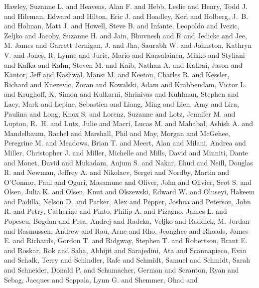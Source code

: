 \documentclass{aa}
\begin{document}
{{{{{{{{{{{{{{{{         {Hawley}, Suzanne L. and {Heavens}, Alan F. and {Hebb}, Leslie and
         {Henry}, Todd J. and {Hileman}, Edward and {Hilton}, Eric J. and
         {Hoadley}, Keri and {Holberg}, J.~B. and {Holman}, Matt J. and
         {Howell}, Steve B. and {Infante}, Leopoldo and {Ivezic}, Zeljko and
         {Jacoby}, Suzanne H. and {Jain}, Bhuvnesh and {R} and {Jedicke} and
         {Jee}, M. James and {Garrett Jernigan}, J. and {Jha}, Saurabh W. and
         {Johnston}, Kathryn V. and {Jones}, R. Lynne and {Juric}, Mario and
         {Kaasalainen}, Mikko and {Styliani} and {Kafka} and {Kahn}, Steven M. and
         {Kaib}, Nathan A. and {Kalirai}, Jason and {Kantor}, Jeff and
         {Kasliwal}, Mansi M. and {Keeton}, Charles R. and {Kessler}, Richard and
         {Knezevic}, Zoran and {Kowalski}, Adam and {Krabbendam}, Victor L. and
         {Krughoff}, K. Simon and {Kulkarni}, Shrinivas and {Kuhlman}, Stephen and
         {Lacy}, Mark and {Lepine}, Sebastien and {Liang}, Ming and {Lien}, Amy and
         {Lira}, Paulina and {Long}, Knox S. and {Lorenz}, Suzanne and
         {Lotz}, Jennifer M. and {Lupton}, R.~H. and {Lutz}, Julie and
         {Macri}, Lucas M. and {Mahabal}, Ashish A. and {Mandelbaum}, Rachel and
         {Marshall}, Phil and {May}, Morgan and {McGehee}, Peregrine M. and
         {Meadows}, Brian T. and {Meert}, Alan and {Milani}, Andrea and
         {Miller}, Christopher J. and {Miller}, Michelle and {Mills}, David and
         {Minniti}, Dante and {Monet}, David and {Mukadam}, Anjum S. and
         {Nakar}, Ehud and {Neill}, Douglas R. and {Newman}, Jeffrey A. and
         {Nikolaev}, Sergei and {Nordby}, Martin and {O'Connor}, Paul and
         {Oguri}, Masamune and {Oliver}, John and {Olivier}, Scot S. and
         {Olsen}, Julia K. and {Olsen}, Knut and {Olszewski}, Edward W. and
         {Oluseyi}, Hakeem and {Padilla}, Nelson D. and {Parker}, Alex and
         {Pepper}, Joshua and {Peterson}, John R. and {Petry}, Catherine and
         {Pinto}, Philip A. and {Pizagno}, James L. and {Popescu}, Bogdan and
         {Prsa}, Andrej and {Radcka}, Veljko and {Raddick}, M. Jordan and
         {Rasmussen}, Andrew and {Rau}, Arne and {Rho}, Jeonghee and
         {Rhoads}, James E. and {Richards}, Gordon T. and {Ridgway}, Stephen T. and
         {Robertson}, Brant E. and {Roskar}, Rok and {Saha}, Abhijit and
         {Sarajedini}, Ata and {Scannapieco}, Evan and {Schalk}, Terry and
         {Schindler}, Rafe and {Schmidt}, Samuel and {Schmidt}, Sarah and
         {Schneider}, Donald P. and {Schumacher}, German and {Scranton}, Ryan and
         {Sebag}, Jacques and {Seppala}, Lynn G. and {Shemmer}, Ohad and
}}}}}}}}}}}}}}}}
\end{document}
